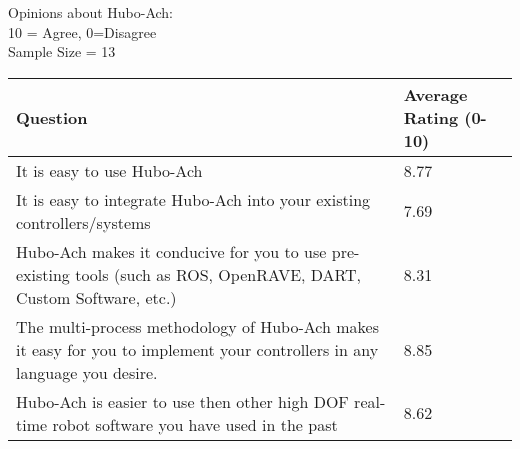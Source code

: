 \begin{table}
\centering
\caption{Q1: Survey on the Unified Algorithmic Framework for Complex System and Humanoids, Hubo-Ach:}\label{table:q1}
Opinions about Hubo-Ach:\\
\small
10 = Agree, 0=Disagree\\
Sample Size = 13
\normalsize
\begin{longtable}{|p{9cm} | p{4cm} | }
\hline
Question	&	Average Rating (0-10)	\\	\hline
\hline
\hline
It is easy to use Hubo-Ach													& 8.77\\
\hline
It is easy to integrate Hubo-Ach into your existing controllers/systems 							& 7.69\\
\hline
Hubo-Ach makes it conducive for you to use pre-existing tools (such as ROS, OpenRAVE, DART, Custom Software, etc.)		& 8.31\\
\hline
The multi-process methodology of Hubo-Ach makes it easy for you to implement your controllers in any language you desire.	& 8.85\\
\hline
Hubo-Ach is easier to use then other high DOF real-time robot software you have used in the past				& 8.62\\
\hline

\end{longtable}

\end{table}
